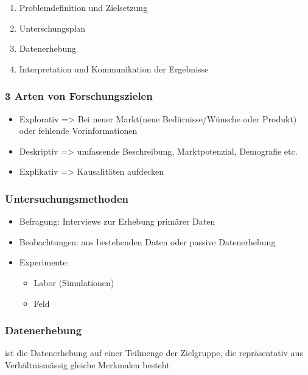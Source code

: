 \begin{enumerate}
    \item Problemdefinition und Zielsetzung 
    \item Unterschungsplan
    \item Datenerhebung 
    \item Interpretation und Kommunikation der Ergebnisse
\end{enumerate}

\subsubsection{3 Arten von Forschungszielen}

\begin{itemize}
    \item Explorativ => Bei neuer Markt(neue Bedürnisse/Wünsche oder Produkt) oder fehlende Vorinformationen
    \item Deskriptiv => umfassende Beschreibung, Marktpotenzial, Demografie etc.
    \item Explikativ => Kausalitäten aufdecken
\end{itemize}

\subsubsection{Untersuchungsmethoden}
\begin{itemize}
    \item Befragung: Interviews zur Erhebung primärer Daten
    \item Beobachtungen: aus bestehenden Daten oder passive Datenerhebung
    \item Experimente:
    \begin{itemize}
        \item Labor (Simulationen)
        \item Feld
    \end{itemize}
\end{itemize}

\subsubsection{Datenerhebung}

\begin{definition}
    [Stichprobe] ist die Datenerhebung auf einer Teilmenge der Zielgruppe, die repräsentativ aus Verhältnismässig gleiche Merkmalen besteht
\end{definition}

